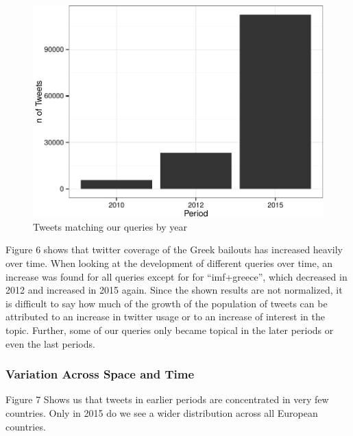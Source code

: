 \documentclass[]{article}
\begin{document}
\begin{figure}

{\centering \includegraphics{fin_paper_files/figure-latex/unnamed-chunk-4-1} 

}

\caption{Tweets matching our queries by year}\label{fig:unnamed-chunk-4}
\end{figure}

Figure 6 shows that twitter coverage of the Greek bailouts has increased
heavily over time. When looking at the development of different queries
over time, an increase was found for all queries except for for
``imf+greece'', which decreased in 2012 and increased in 2015 again.
Since the shown results are not normalized, it is difficult to say how
much of the growth of the population of tweets can be attributed to an
increase in twitter usage or to an increase of interest in the topic.
Further, some of our queries only became topical in the later periods or
even the last periods.

\subsubsection{Variation Across Space and
Time}\label{variation-across-space-and-time}

Figure 7 Shows us that tweets in earlier periods are concentrated in
very few countries. Only in 2015 do we see a wider distribution across
all European countries.
\end{document}
